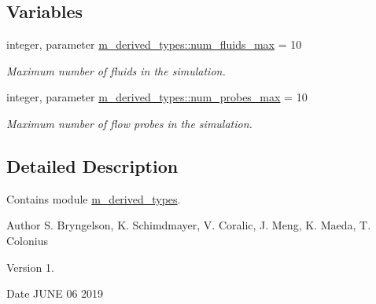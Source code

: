 \subsection*{Variables}
\begin{DoxyCompactItemize}
\item 
integer, parameter \hyperlink{namespacem__derived__types_a3dde07670ef3e164534aa68c1830ff62}{m\+\_\+derived\+\_\+types\+::num\+\_\+fluids\+\_\+max} = 10
\begin{DoxyCompactList}\small\item\em Maximum number of fluids in the simulation. \end{DoxyCompactList}\item 
integer, parameter \hyperlink{namespacem__derived__types_aa02f02777c477f6be0f89717ab209441}{m\+\_\+derived\+\_\+types\+::num\+\_\+probes\+\_\+max} = 10
\begin{DoxyCompactList}\small\item\em Maximum number of flow probes in the simulation. \end{DoxyCompactList}\end{DoxyCompactItemize}


\subsection{Detailed Description}
Contains module \hyperlink{namespacem__derived__types}{m\+\_\+derived\+\_\+types}. 

\begin{DoxyAuthor}{Author}
S. Bryngelson, K. Schimdmayer, V. Coralic, J. Meng, K. Maeda, T. Colonius 
\end{DoxyAuthor}
\begin{DoxyVersion}{Version}
1. 
\end{DoxyVersion}
\begin{DoxyDate}{Date}
J\+U\+NE 06 2019 
\end{DoxyDate}
